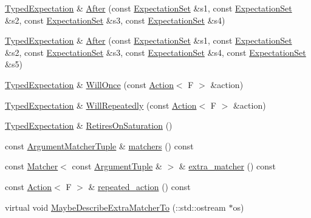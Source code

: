 \begin{DoxyCompactItemize}
\hyperlink{classtesting_1_1internal_1_1_typed_expectation}{Typed\+Expectation} \& \hyperlink{classtesting_1_1internal_1_1_typed_expectation_a1749e368f659352ed8375512acafc178}{After} (const \hyperlink{classtesting_1_1_expectation_set}{Expectation\+Set} \&s1, const \hyperlink{classtesting_1_1_expectation_set}{Expectation\+Set} \&s2, const \hyperlink{classtesting_1_1_expectation_set}{Expectation\+Set} \&s3, const \hyperlink{classtesting_1_1_expectation_set}{Expectation\+Set} \&s4)
\item 
\hyperlink{classtesting_1_1internal_1_1_typed_expectation}{Typed\+Expectation} \& \hyperlink{classtesting_1_1internal_1_1_typed_expectation_a72c0105b147ee2995d183c8e4109f6ca}{After} (const \hyperlink{classtesting_1_1_expectation_set}{Expectation\+Set} \&s1, const \hyperlink{classtesting_1_1_expectation_set}{Expectation\+Set} \&s2, const \hyperlink{classtesting_1_1_expectation_set}{Expectation\+Set} \&s3, const \hyperlink{classtesting_1_1_expectation_set}{Expectation\+Set} \&s4, const \hyperlink{classtesting_1_1_expectation_set}{Expectation\+Set} \&s5)
\item 
\hyperlink{classtesting_1_1internal_1_1_typed_expectation}{Typed\+Expectation} \& \hyperlink{classtesting_1_1internal_1_1_typed_expectation_a41b0d15e44e95d52f4d5c310fb9e9683}{Will\+Once} (const \hyperlink{classtesting_1_1_action}{Action}$<$ F $>$ \&action)
\item 
\hyperlink{classtesting_1_1internal_1_1_typed_expectation}{Typed\+Expectation} \& \hyperlink{classtesting_1_1internal_1_1_typed_expectation_a73586c1adb458c5c431df9679e46f5f1}{Will\+Repeatedly} (const \hyperlink{classtesting_1_1_action}{Action}$<$ F $>$ \&action)
\item 
\hyperlink{classtesting_1_1internal_1_1_typed_expectation}{Typed\+Expectation} \& \hyperlink{classtesting_1_1internal_1_1_typed_expectation_ae7c42958a5d2c336ba7a42a871bf7709}{Retires\+On\+Saturation} ()
\item 
const \hyperlink{classtesting_1_1internal_1_1_typed_expectation_a8f10e3906761cc5c10fa3561c6e8938e}{Argument\+Matcher\+Tuple} \& \hyperlink{classtesting_1_1internal_1_1_typed_expectation_ad1a18c39511a2f6fda425881cddcc31a}{matchers} () const
\item 
const \hyperlink{classtesting_1_1_matcher}{Matcher}$<$ const \hyperlink{classtesting_1_1internal_1_1_typed_expectation_a9a91379262d101f435809ba4556d14fa}{Argument\+Tuple} \& $>$ \& \hyperlink{classtesting_1_1internal_1_1_typed_expectation_a0ee00342b872ae257cae31bc86b9a34b}{extra\+\_\+matcher} () const
\item 
const \hyperlink{classtesting_1_1_action}{Action}$<$ F $>$ \& \hyperlink{classtesting_1_1internal_1_1_typed_expectation_a2b32621ac4d71c1a71893eb0499f723d}{repeated\+\_\+action} () const
\item 
virtual void \hyperlink{classtesting_1_1internal_1_1_typed_expectation_ab019251041a408dc5a5d8ae216be53f4}{Maybe\+Describe\+Extra\+Matcher\+To} (\+::std\+::ostream $\ast$os)
\end{DoxyCompactItemize}
